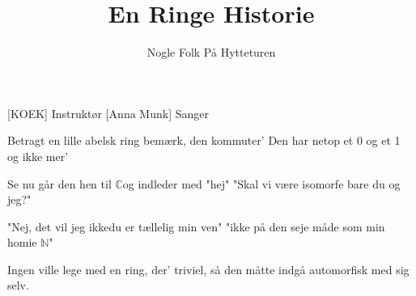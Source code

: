 \documentclass[a4paper,11pt]{article}
\title{En Ringe Historie}
\author{Nogle Folk På Hytteturen}
\begin{document}
\maketitle

\begin{roles}
[KOEK] Instruktør
[Anna Munk] Sanger
\end{roles}

\begin{song}
 Betragt en lille abelsk ring bemærk, den kommuter'
Den har netop et 0 og et 1 og ikke mer'

Se nu går den hen til $\mathbb{C}$og indleder med "hej"
"Skal vi være isomorfe bare du og jeg?"
 
"Nej, det vil jeg ikkedu er tællelig min ven"
"ikke på den seje måde som min homie $\mathbb{N}$"
 
Ingen ville lege med en ring, der' triviel,
så den måtte indgå automorfisk med sig selv.

\end{song}
\end{document}
